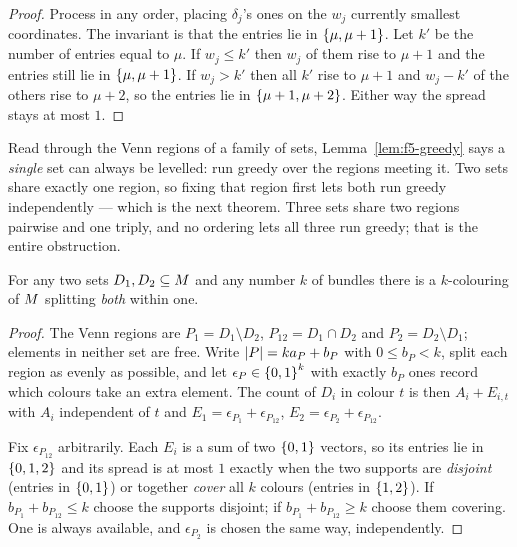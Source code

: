 \begin{proof}
Process in any order, placing $\delta_j$'s ones on the $w_j$ currently smallest
coordinates. The invariant is that the entries lie in $\left\{\mu,\mu+1\right\}$. Let $k'$
be the number of entries equal to $\mu$. If $w_j \le k'$ then $w_j$ of them rise
to $\mu+1$ and the entries still lie in $\left\{\mu,\mu+1\right\}$. If $w_j > k'$ then all
$k'$ rise to $\mu+1$ and $w_j - k'$ of the others rise to $\mu+2$, so the entries
lie in $\left\{\mu+1,\mu+2\right\}$. Either way the spread stays at most $1$.
\end{proof}

Read through the Venn regions of a family of sets, Lemma~\ref{lem:f5-greedy} says
a \emph{single} set can always be levelled: run greedy over the regions meeting
it. Two sets share exactly one region, so fixing that region first lets both run
greedy independently --- which is the next theorem. Three sets share two regions
pairwise and one triply, and no ordering lets all three run greedy; that is the
entire obstruction.

\begin{theorem}
\label{thm:f5-twoset}
For any two sets $D_1, D_2 \subseteq M$ and any number $k$ of bundles there
is a $k$-colouring of $M$ splitting \emph{both} within one.
\end{theorem}

\begin{proof}
The Venn regions are $P_1 = D_1 \setminus D_2$, $P_{12} = D_1 \cap D_2$ and
$P_2 = D_2 \setminus D_1$; elements in neither set are free. Write
$\left\lvert P\right\rvert = k a_P + b_P$ with $0 \le b_P < k$, split each region as evenly as
possible, and let $\epsilon_P \in \left\{0,1\right\}^k$ with exactly $b_P$ ones record
which colours take an extra element. The count of $D_i$ in colour $t$ is then
$A_i + E_{i,t}$ with $A_i$ independent of $t$ and
$E_1 = \epsilon_{P_1} + \epsilon_{P_{12}}$, $E_2 = \epsilon_{P_2} +
\epsilon_{P_{12}}$.

Fix $\epsilon_{P_{12}}$ arbitrarily. Each $E_i$ is a sum of two $\left\{0,1\right\}$
vectors, so its entries lie in $\left\{0,1,2\right\}$ and its spread is at most $1$
exactly when the two supports are \emph{disjoint} (entries in $\left\{0,1\right\}$) or
together \emph{cover} all $k$ colours (entries in $\left\{1,2\right\}$). If
$b_{P_1} + b_{P_{12}} \le k$ choose the supports disjoint; if
$b_{P_1} + b_{P_{12}} \ge k$ choose them covering. One is always available, and
$\epsilon_{P_2}$ is chosen the same way, independently.
\end{proof}

